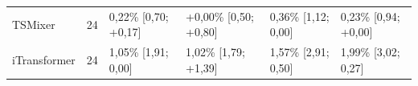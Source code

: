 \begin{table}[htbp]
\begin{tabular}{lrllll}
TSMixer & 24 & \textminus{}0,22\% [\textminus{}0,70; +0,17] & +0,00\% [\textminus{}0,50; +0,80] & \textminus{}0,36\% [\textminus{}1,12; \textminus{}0,00] & \textminus{}0,23\% [\textminus{}0,94; +0,00] \\
iTransformer & 24 & \textminus{}1,05\% [\textminus{}1,91; \textminus{}0,00] & \textminus{}1,02\% [\textminus{}1,79; +1,39] & \textminus{}1,57\% [\textminus{}2,91; \textminus{}0,50] & \textminus{}1,99\% [\textminus{}3,02; \textminus{}0,27] \\
\bottomrule
\end{tabular}
\par{}
\end{table}
